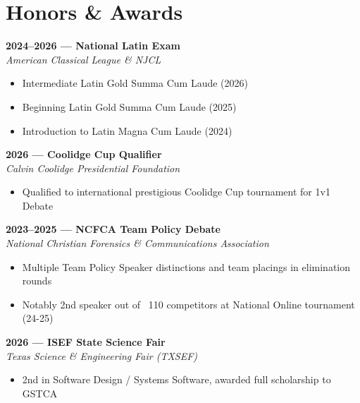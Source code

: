 \documentclass[11pt]{article}
\begin{document}
\vspace{0.4em}
\section*{Honors \& Awards}

    \textbf{2024--2026 --- National Latin Exam} \\
    \textit{American Classical League \& NJCL}
    \vspace{-0.5em}
    \begin{itemize}
        \item Intermediate Latin Gold Summa Cum Laude (2026)
        \item Beginning Latin Gold Summa Cum Laude (2025)
        \item Introduction to Latin Magna Cum Laude (2024)
    \end{itemize}

    \vspace{0.25em}
    \textbf{2026 --- Coolidge Cup Qualifier} \\
    \textit{Calvin Coolidge Presidential Foundation}
    \vspace{-0.5em}
    \begin{itemize}
        \item Qualified to international prestigious Coolidge Cup tournament for 1v1 Debate
    \end{itemize}

    \vspace{0.25em}
    \textbf{2023--2025 --- NCFCA Team Policy Debate} \\
    \textit{National Christian Forensics \& Communications Association}
    \vspace{-0.5em}
    \begin{itemize}
        \item Multiple Team Policy Speaker distinctions and team placings in elimination rounds
        \item Notably 2nd speaker out of ~110 competitors at National Online tournament (24-25)
    \end{itemize}

    \vspace{0.25em}
    \textbf{2026 --- ISEF State Science Fair} \\
    \textit{Texas Science \& Engineering Fair (TXSEF)}
    \vspace{-0.5em}
    \begin{itemize}
        \item 2nd in Software Design / Systems Software, awarded full scholarship to GSTCA
    \end{itemize}
\end{document}
